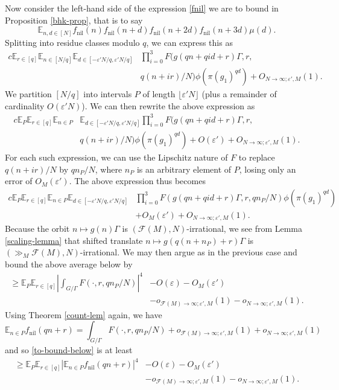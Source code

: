 \documentclass[11pt,reqno]{amsart}
\numberwithin{equation}{section}
\theoremstyle{plain}
\theoremstyle{definition}
\renewcommand{\geq}{\geqslant}
\newcommand\E{{\mathbb{E}}}
\newcommand\1{{\bf 1}}
\newcommand\2{{\bf 2}}
\newcommand\eps{\varepsilon}
\newcommand\nil{{\operatorname{nil}}}
\newcommand\Grow{{\mathcal F}}
\begin{document}
Now consider the left-hand side of the expression \eqref{fnil} we are to bound in Proposition \ref{bhk-prop}, that is to say  
\begin{equation}\label{to-bound-below} \E_{n,d \in [N]} f_\nil(n) f_\nil(n+d)f_\nil (n+2d) f_\nil (n + 3d) \mu(d). \end{equation}
Splitting into residue classes modulo $q$, we can express this as
\begin{align*}
c \E_{r \in [q]} \E_{n \in [N/q]} \E_{d \in [-\eps'N/q,\eps'N/q]} &\prod_{i=0}^3 F(g(qn+qid+r)\Gamma, r, \\ & q(n+ir)/N) \phi(\pi(g_1)^{qd}) + O_{N\to \infty;\eps',M}(1).
\end{align*}
We partition $[N/q]$ into intervals $P$ of length $\lfloor \eps' N\rfloor$ (plus a remainder of cardinality $O(\eps' N)$).  We can then rewrite the above expression as 
\begin{align*}
c \E_P \E_{r \in [q]} \E_{n \in P} & \E_{d \in [-\eps'N/q,\eps'N/q]} \prod_{i=0}^3 F(g(qn+qid+r)\Gamma, r,\\ & q(n+ir)/N) \phi(\pi(g_1)^{qd}) + O(\eps')+O_{N\to \infty;\eps',M}(1).
\end{align*}
For each such expression, we can use the Lipschitz nature of $F$ to replace $q(n+ir)/N$ by $qn_P/N$, where $n_P$ is an arbitrary element of $P$, losing only an error of $O_M(\eps')$.  The above expression thus becomes
\begin{align*} c \E_P \E_{r \in [q]} \E_{n \in P} \E_{d \in [-\eps'N/q,\eps'N/q]} & \prod_{i=0}^3 F(g(qn+qid+r)\Gamma, r, qn_P/N) \phi(\pi(g_1)^{qd}) \\ & + O_M(\eps') +O_{N\to \infty;\eps',M}(1).\end{align*}
Because the orbit $n \mapsto g(n) \Gamma$ is $(\Grow(M),N)$-irrational, we see from Lemma \ref{scaling-lemma} that shifted translate $n \mapsto g(q(n+n_P)+r) \Gamma$ is $(\gg_M \Grow(M),N)$-irrational.  We may then argue as in the previous case and bound the above average below by
\begin{align*} \geq \E_P \E_{r \in [q]} |\int_{G/\Gamma} F(\cdot,r,qn_P/N)|^4 & - O(\eps) - O_M(\eps')  \\ &- o_{\Grow(M) \to \infty; \eps',M}(1) - o_{N \to \infty;\eps',M}(1).\end{align*}
Using Theorem \ref{count-lem} again, we have
$$ \E_{n \in P} f_\nil(qn+r) = \int_{G/\Gamma} F(\cdot,r,qn_P/N) + o_{\Grow(M) \to \infty; \eps',M}(1) + o_{N \to \infty;\eps',M}(1)$$
and so \eqref{to-bound-below} is at least
\begin{align*} \geq \E_P \E_{r \in [q]} |\E_{n \in P} f_\nil(qn+r)|^4 & - O(\eps) - O_M(\eps') \\ &- o_{\Grow(M) \to \infty; \eps',M}(1) - o_{N \to \infty;\eps',M}(1).\end{align*}
\end{document}

